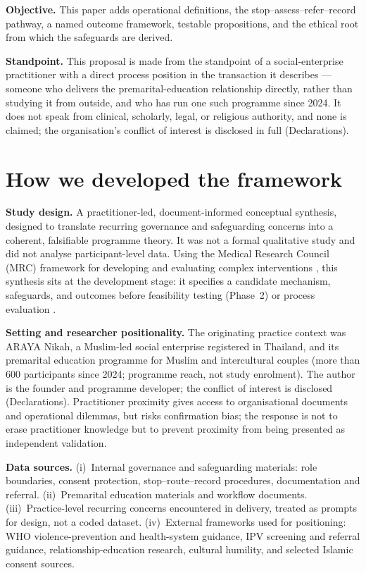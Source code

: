 \documentclass[11pt]{article}
\begin{document}
\textbf{Objective.} This paper adds operational definitions, the stop--assess--refer--record pathway, a named outcome framework, testable propositions, and the ethical root from which the safeguards are derived.

\textbf{Standpoint.} This proposal is made from the standpoint of a social-enterprise practitioner with a direct process position in the transaction it describes --- someone who delivers the premarital-education relationship directly, rather than studying it from outside, and who has run one such programme since 2024. It does not speak from clinical, scholarly, legal, or religious authority, and none is claimed; the organisation's conflict of interest is disclosed in full (Declarations).

\section{How we developed the framework}
\textbf{Study design.} A practitioner-led, document-informed conceptual synthesis, designed to translate recurring governance and safeguarding concerns into a coherent, falsifiable programme theory. It was not a formal qualitative study and did not analyse participant-level data. Using the Medical Research Council (MRC) framework for developing and evaluating complex interventions \cite{ref52}, this synthesis sits at the development stage: it specifies a candidate mechanism, safeguards, and outcomes before feasibility testing (Phase~2) or process evaluation \cite{ref54}.

\textbf{Setting and researcher positionality.} The originating practice context was ARAYA Nikah, a Muslim-led social enterprise registered in Thailand, and its premarital education programme for Muslim and intercultural couples (more than 600 participants since 2024; programme reach, not study enrolment). The author is the founder and programme developer; the conflict of interest is disclosed (Declarations). Practitioner proximity gives access to organisational documents and operational dilemmas, but risks confirmation bias; the response is not to erase practitioner knowledge but to prevent proximity from being presented as independent validation.

\textbf{Data sources.} (i)~Internal governance and safeguarding materials: role boundaries, consent protection, stop--route--record procedures, documentation and referral. (ii)~Premarital education materials and workflow documents. (iii)~Practice-level recurring concerns encountered in delivery, treated as prompts for design, not a coded dataset. (iv)~External frameworks used for positioning: WHO violence-prevention and health-system guidance, IPV screening and referral guidance, relationship-education research, cultural humility, and selected Islamic consent sources.
\end{document}
